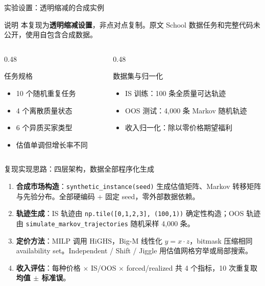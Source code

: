 \documentclass[10pt,aspectratio=169]{beamer}
\newcommand{\key}[1]{\textcolor{ZJUBlue}{\textbf{#1}}}
\newcommand{\good}[1]{\textcolor{ZJUGreen}{\textbf{#1}}}
\begin{document}
\begin{frame}{实验设置：透明缩减的合成实例}
  \begin{block}{说明}
    本复现为\key{透明缩减设置}，非点对点复制。原文 School 数据任务和完整代码未公开，使用自包含合成数据。
  \end{block}
  \vspace{0.3em}
  \begin{columns}[T,onlytextwidth]
    \begin{column}{0.48\textwidth}
      \begin{block}{任务规格}
        \begin{itemize}
          \item 10 个随机重复任务
          \item 4 个离散质量状态
          \item 6 个异质买家类型
          \item 估值单调但增长率不同
        \end{itemize}
      \end{block}
    \end{column}
    \begin{column}{0.48\textwidth}
      \begin{block}{数据集与归一化}
        \begin{itemize}
          \item IS 训练：100 条全质量可达轨迹
          \item OOS 测试：4,000 条 Markov 随机轨迹
          \item 收入归一化：除以零价格期望福利
        \end{itemize}
      \end{block}
    \end{column}
  \end{columns}
\end{frame}

\begin{frame}{复现实现思路：四层架构，数据全部程序化生成}
  \begin{enumerate}
    \setlength{\itemsep}{0.6em}
    \item \key{合成市场构造}：\texttt{synthetic\_instance(seed)} 生成估值矩阵、Markov 转移矩阵与先验分布。全部硬编码 + 固定 seed，零外部数据依赖。
    \item \key{轨迹生成}：IS 轨迹由 \texttt{np.tile([0,1,2,3], (100,1))} 确定性构造；OOS 轨迹由 \texttt{simulate\_markov\_trajectories} 随机采样 4,000 条。
    \item \key{定价方法}：MILP 调用 HiGHS，Big-M 线性化 $y=x\cdot z$，bitmask 压缩相同 availability set。Independent / Shift / Jiggle 用估值网格穷举或局部搜索。
    \item \key{收入评估}：每种价格 $\times$ IS/OOS $\times$ forced/realized 共 4 个指标，10 次重复取 \good{均值 $\pm$ 标准误}。
  \end{enumerate}
\end{frame}
\end{document}

